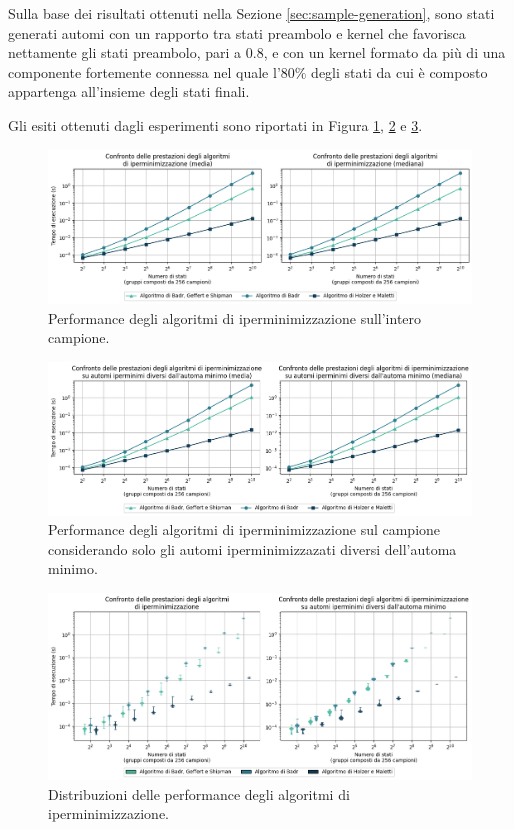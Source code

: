 \documentclass[a4paper,12pt]{report} %
\begin{document}
Sulla base dei risultati ottenuti nella Sezione \ref{sec:sample-generation}, sono stati generati automi
con un rapporto tra stati preambolo e kernel che favorisca nettamente gli stati preambolo,
pari a $0.8$, e con un kernel formato da più di una componente fortemente connessa nel quale
l'$80\%$ degli stati da cui è composto appartenga all'insieme degli stati finali.

Gli esiti ottenuti dagli esperimenti sono riportati in Figura \ref{fig:dfa-pcomparison-all-lines}, 
\ref{fig:dfa-pcomparison-only-lines} e \ref{fig:dfa-pcomparison-violin}.

\begin{figure}[!htb]
  \centering
  \includegraphics[width=1\linewidth]{images/performance_all_line.png}
  \caption{\label{fig:dfa-pcomparison-all-lines}Performance degli algoritmi di iperminimizzazione sull'intero campione.}
\end{figure}

\begin{figure}[!htb]
  \centering
  \includegraphics[width=1\linewidth]{images/performance_filtered_line.png}
  \caption{\label{fig:dfa-pcomparison-only-lines}Performance degli algoritmi di iperminimizzazione sul
  campione considerando solo gli automi iperminimizzazati diversi dell'automa minimo.}
\end{figure}

\begin{figure}[!htb]
  \centering
  \includegraphics[width=1\linewidth]{images/performance_violin.png}
  \caption{\label{fig:dfa-pcomparison-violin}Distribuzioni delle performance degli algoritmi di iperminimizzazione.}
\end{figure}
\end{document}
